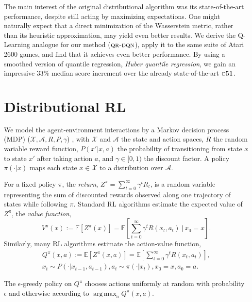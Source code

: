 \documentclass[letterpaper]{article}
\DeclareMathOperator*{\argmax}{arg\,max}
\def \cfo {\textsc{c51}}
\def \qrdqn {\textsc{qr-dqn}}
\begin{document}
The main interest of the original distributional algorithm was its state-of-the-art performance, despite still acting by maximizing expectations. One might naturally expect that a direct minimization of the Wasserstein metric, rather than its heuristic approximation, may yield even better results. We derive the Q-Learning analogue for our method ($\qrdqn$), apply it to the same suite of Atari 2600 games, and find that it achieves even better performance. By using a smoothed version of quantile regression, \emph{Huber quantile regression}, we gain an impressive $33\%$ median score increment over the already state-of-the-art $\cfo$.

\section{Distributional RL}

We model the agent-environment interactions by a Markov decision process (MDP) ($\mathcal{X}, \mathcal{A}, R, P, \gamma$) \cite{puterman94markov}, with $\mathcal{X}$ and $\mathcal{A}$ the state and action spaces, $R$ the random variable reward function, $P(x' | x, a)$ the probability of transitioning from state $x$ to state $x'$ after taking action $a$, and $\gamma \in [0, 1)$ the discount factor. A policy $\pi(\cdot | x)$ maps each state $x \in \mathcal{X}$ to a distribution over $\mathcal{A}$.

For a fixed policy $\pi$, the \textit{return}, $Z^\pi = \sum_{t = 0}^\infty \gamma^t R_t$, is a random variable representing the sum of discounted rewards observed along one trajectory of states while following $\pi$. Standard RL algorithms estimate the expected value of $Z^\pi$, the \textit{value function}, 
\begin{equation}
    V^\pi(x) := \mathbb{E} \left[ Z^\pi(x) \right] = \mathbb{E} \left[ \sum_{t=0}^\infty \gamma^t R(x_t, a_t)\ |\ x_0 = x\right].
\end{equation}
Similarly, many RL algorithms estimate the action-value function,
\begin{eqnarray}
    Q^\pi(x, a) := \mathbb{E} \left[ Z^\pi(x, a) \right] = \mathbb{E} \left[ \sum_{t=0}^\infty \gamma^t R(x_t, a_t) \right],\\
    \nonumber x_t \sim P(\cdot | x_{t-1}, a_{t-1}), a_t \sim \pi(\cdot | x_t),x_0=x, a_0=a.
\end{eqnarray}

The $\epsilon$-greedy policy on $Q^\pi$ chooses actions uniformly at random with probability $\epsilon$ and otherwise according to $\argmax_a Q^\pi(x, a)$. 
\end{document}

